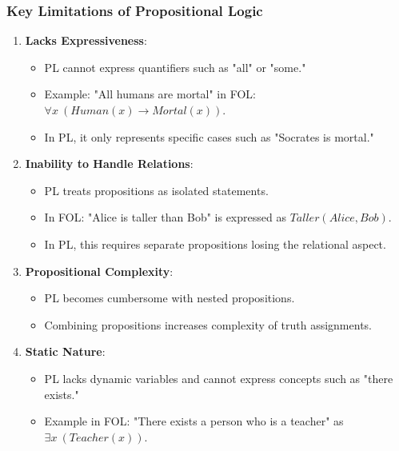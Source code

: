 \documentclass[aspectratio=169]{beamer}
\begin{document}
\begin{frame}[fragile]
    \frametitle{Key Limitations of Propositional Logic}
    
    \begin{enumerate}
        \item \textbf{Lacks Expressiveness}:
            \begin{itemize}
                \item PL cannot express quantifiers such as "all" or "some."
                \item Example: "All humans are mortal" in FOL: $\forall x \ (Human(x) \rightarrow Mortal(x))$.
                \item In PL, it only represents specific cases such as "Socrates is mortal."
            \end{itemize}
        
        \item \textbf{Inability to Handle Relations}:
            \begin{itemize}
                \item PL treats propositions as isolated statements.
                \item In FOL: "Alice is taller than Bob" is expressed as $Taller(Alice, Bob)$.
                \item In PL, this requires separate propositions losing the relational aspect.
            \end{itemize}
        
        \item \textbf{Propositional Complexity}:
            \begin{itemize}
                \item PL becomes cumbersome with nested propositions.
                \item Combining propositions increases complexity of truth assignments.
            \end{itemize}
        
        \item \textbf{Static Nature}:
            \begin{itemize}
                \item PL lacks dynamic variables and cannot express concepts such as "there exists."
                \item Example in FOL: "There exists a person who is a teacher" as $\exists x \ (Teacher(x))$.
            \end{itemize}
    \end{enumerate}
\end{frame}
\end{document}

